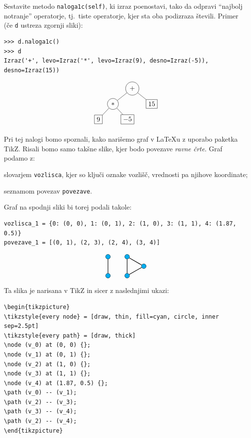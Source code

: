 \documentclass[arhiv]{../izpit}
\begin{document}
\podnaloga[10 točk]
Sestavite metodo \texttt{naloga1c(self)}, ki izraz poenostavi, tako da odpravi ``najbolj notranje'' operatorje, tj.\ tiste
operatorje, kjer sta oba podizraza števili. Primer (če \texttt{d} ustreza zgornji sliki):
%
\begin{verbatim}
>>> d.naloga1c()
>>> d
Izraz('+', levo=Izraz('*', levo=Izraz(9), desno=Izraz(-5)), desno=Izraz(15))
\end{verbatim}
$$
%
\begin{tikzpicture}[level distance=0.8cm,
    level 1/.style={sibling distance=2cm},
    level 2/.style={sibling distance=1.5cm},
    ]
    \node[circle, draw] (d) {$+$}
      child {node[circle, draw] {$*$}
        child {node[rectangle, draw] {$9$}}
        child {node[rectangle, draw] {$-5$}}
      }
      child {node[rectangle, draw] {$15$}};
  \end{tikzpicture}
$$


Pri tej nalogi bomo spoznali, kako narišemo graf v \LaTeX u z uporabo paketka TikZ. Risali bomo
samo takšne slike, kjer bodo povezave \emph{ravne črte}. Graf podamo z:
\begin{compactitem}
\item slovarjem \texttt{vozlisca}, kjer so ključi oznake vozlišč, vrednosti pa njihove koordinate;
\item seznamom povezav \texttt{povezave}.
\end{compactitem}
%
Graf na spodnji sliki bi torej podali takole:
\begin{verbatim}
vozlisca_1 = {0: (0, 0), 1: (0, 1), 2: (1, 0), 3: (1, 1), 4: (1.87, 0.5)}
povezave_1 = [(0, 1), (2, 3), (2, 4), (3, 4)]
\end{verbatim}
%
$$
\begin{tikzpicture}
\tikzstyle{every node} = [draw, thin, fill=cyan, circle, inner sep=2.5pt]
\tikzstyle{every path} = [draw, thick]
\node (v_0) at (0, 0) {};
\node (v_1) at (0, 1) {};
\node (v_2) at (1, 0) {};
\node (v_3) at (1, 1) {};
\node (v_4) at (1.87, 0.5) {};
\path (v_0) -- (v_1);
\path (v_2) -- (v_3);
\path (v_3) -- (v_4);
\path (v_2) -- (v_4);
\end{tikzpicture}
$$
%
Ta slika je narisana v TikZ in sicer z naslednjimi ukazi:
\begin{verbatim}
\begin{tikzpicture}
\tikzstyle{every node} = [draw, thin, fill=cyan, circle, inner sep=2.5pt]
\tikzstyle{every path} = [draw, thick]
\node (v_0) at (0, 0) {};
\node (v_1) at (0, 1) {};
\node (v_2) at (1, 0) {};
\node (v_3) at (1, 1) {};
\node (v_4) at (1.87, 0.5) {};
\path (v_0) -- (v_1);
\path (v_2) -- (v_3);
\path (v_3) -- (v_4);
\path (v_2) -- (v_4);
\end{tikzpicture}
\end{verbatim}
\end{document}
